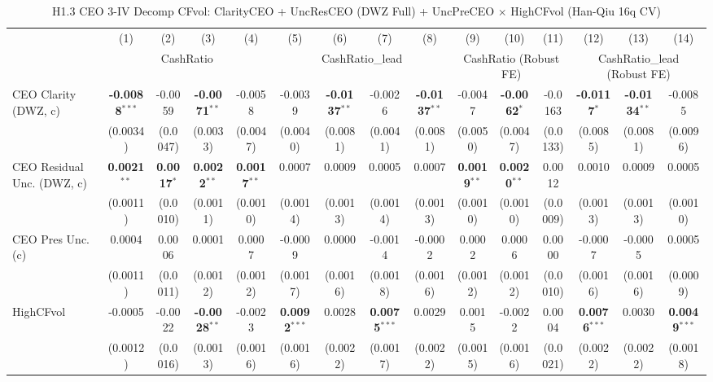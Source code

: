 \documentclass[11pt,a4paper]{article}
\begin{document}
\clearpage
\begin{table}[htbp]
\centering
\caption{H1.3 CEO 3-IV Decomp CFvol: ClarityCEO + UncResCEO (DWZ Full) + UncPreCEO $\times$ HighCFvol (Han-Qiu 16q CV)}
\label{tab:h1_3_cfvol}
\scriptsize
\begin{tabular}{lcccccccccccccc}
\toprule
 & (1) & (2) & (3) & (4) & (5) & (6) & (7) & (8) & (9) & (10) & (11) & (12) & (13) & (14) \\
 & \multicolumn{4}{c}{CashRatio} & \multicolumn{4}{c}{CashRatio\_lead} & \multicolumn{3}{c}{CashRatio (Robust FE)} & \multicolumn{3}{c}{CashRatio\_lead (Robust FE)} \\
\cmidrule(lr){2-5} \cmidrule(lr){6-9} \cmidrule(lr){10-12} \cmidrule(lr){13-15}
\midrule
CEO Clarity (DWZ, c) & \textbf{-0.0088}$^{***}$ & -0.0059 & \textbf{-0.0071}$^{**}$ & -0.0058 & -0.0039 & \textbf{-0.0137}$^{**}$ & -0.0026 & \textbf{-0.0137}$^{**}$ & -0.0047 & \textbf{-0.0062}$^{*}$ & -0.0163 & \textbf{-0.0117}$^{*}$ & \textbf{-0.0134}$^{**}$ & -0.0085 \\
 & (0.0034) & (0.0047) & (0.0033) & (0.0047) & (0.0040) & (0.0081) & (0.0041) & (0.0081) & (0.0050) & (0.0047) & (0.0133) & (0.0085) & (0.0081) & (0.0096) \\
CEO Residual Unc. (DWZ, c) & \textbf{0.0021}$^{**}$ & \textbf{0.0017}$^{*}$ & \textbf{0.0022}$^{**}$ & \textbf{0.0017}$^{**}$ & 0.0007 & 0.0009 & 0.0005 & 0.0007 & \textbf{0.0019}$^{**}$ & \textbf{0.0020}$^{**}$ & 0.0012 & 0.0010 & 0.0009 & 0.0005 \\
 & (0.0011) & (0.0010) & (0.0011) & (0.0010) & (0.0014) & (0.0013) & (0.0014) & (0.0013) & (0.0010) & (0.0010) & (0.0009) & (0.0013) & (0.0013) & (0.0010) \\
CEO Pres Unc. (c) & 0.0004 & 0.0006 & 0.0001 & 0.0007 & -0.0009 & 0.0000 & -0.0014 & -0.0002 & 0.0002 & 0.0006 & 0.0000 & -0.0007 & -0.0005 & 0.0005 \\
 & (0.0011) & (0.0011) & (0.0012) & (0.0012) & (0.0017) & (0.0016) & (0.0018) & (0.0016) & (0.0012) & (0.0012) & (0.0010) & (0.0016) & (0.0016) & (0.0009) \\
HighCFvol & -0.0005 & -0.0022 & \textbf{-0.0028}$^{**}$ & -0.0023 & \textbf{0.0092}$^{***}$ & 0.0028 & \textbf{0.0075}$^{***}$ & 0.0029 & 0.0015 & -0.0022 & 0.0004 & \textbf{0.0076}$^{***}$ & 0.0030 & \textbf{0.0049}$^{***}$ \\
 & (0.0012) & (0.0016) & (0.0013) & (0.0016) & (0.0016) & (0.0022) & (0.0017) & (0.0022) & (0.0015) & (0.0016) & (0.0021) & (0.0022) & (0.0022) & (0.0018) \\

\end{tabular}
\end{table}
\end{document}
